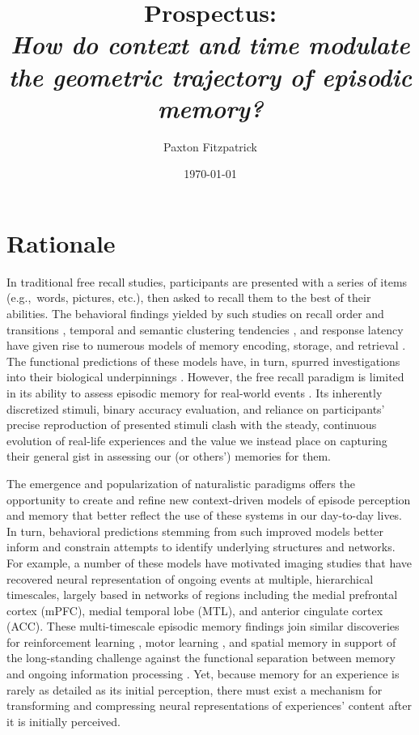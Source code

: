 \documentclass{article}
\title{Prospectus: \\
\textit{How do context and time modulate the geometric trajectory of episodic memory?}
}
\author{Paxton Fitzpatrick}
\date{\today}
\begin{document}
\maketitle

\section{Rationale}

In traditional free recall studies, participants are presented with a series of items (e.g.,~words, pictures, etc.), then asked to recall them to the best of their abilities. The behavioral findings yielded by such studies on recall order and transitions \citep{Murd62a, Kaha96}, temporal and semantic clustering tendencies \citep{HowaKaha02b}, and response latency \citep{MurdOkad70} have given rise to numerous models of memory encoding, storage, and retrieval \citep[e.g.,][]{AtkiShif68, HowaKaha02a, SedeEtal08}.  The functional predictions of these models have, in turn, spurred investigations into their biological underpinnings \citep[e.g.,][]{PolyEtal05a, MannEtal11,MannEtal12,HowaEtal12}.  However, the free recall paradigm is limited in its ability to assess episodic memory for real-world events \citep[see][]{KoriGold94,ChenEtal17,HukEtal18,BaldEtal18,HeusEtal18c,Mann19}.  Its inherently discretized stimuli, binary accuracy evaluation, and reliance on participants' precise reproduction of presented stimuli clash with the steady, continuous evolution of real-life experiences and the value we instead place on capturing their general gist in assessing our (or others') memories for them.

The emergence and popularization of naturalistic paradigms offers the opportunity to create and refine new context-driven models of episode perception and memory that better reflect the use of these systems in our day-to-day lives. In turn, behavioral predictions stemming from such improved models better inform and constrain attempts to identify underlying structures and networks.  For example, a number of these models \citep[e.g.,][]{ChenEtal17} have motivated imaging studies that have recovered neural representation of ongoing events at multiple, hierarchical timescales, largely based in networks of regions including the medial prefrontal cortex (mPFC), medial temporal lobe (MTL), and anterior cingulate cortex (ACC).  These multi-timescale episodic memory findings join similar discoveries for reinforcement learning \citep[e.g.,][]{BernEtal11, BromEtal10c}, motor learning \citep[e.g.,][]{FusiEtal07, KimEtal15}, and spatial memory \citep[e.g.,][]{StraEtal14} in support of the long-standing challenge against the functional separation between memory and ongoing information processing \citep[see][]{HassEtal15}.  Yet, because memory for an experience is rarely as detailed as its initial perception, there must exist a mechanism for transforming and compressing neural representations of experiences' content after it is initially perceived.
\end{document}
